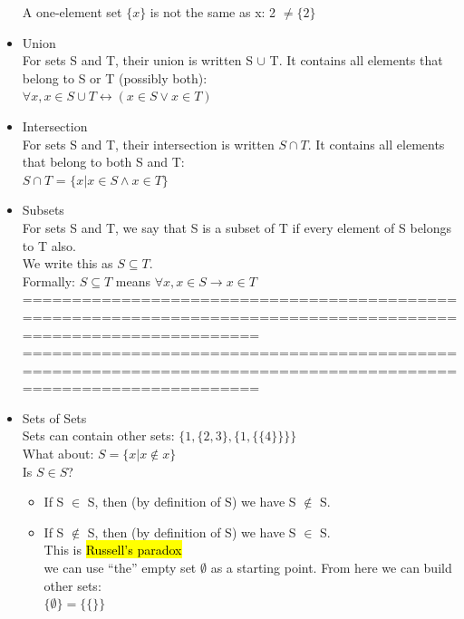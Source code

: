 \documentclass{article}
\begin{document}
\begin{itemize}
A one-element set $\{x\}$ is not the same as x: 2 $\neq \{2\}$\\
\item Union\\
For sets S and T, their union is written S $\cup$ T.
It contains all elements that belong to S or T (possibly both):\\
$\forall x, x \in S \cup T \leftrightarrow (x \in S \lor x \in T)$\\
\item Intersection\\
For sets S and T, their intersection is written $S  \cap  T$.
It contains all elements that belong to both S and T:\\
$S \cap T$ = $\{ x | x \in S \land x \in T  \}$\\
\item Subsets\\
For sets S and T, we say that S is a subset of T if
every element of S belongs to T also.\\
We write this as $S \subseteq T$.\\Formally:
$S \subseteq T$ means  $\forall x , x \in S \rightarrow x \in T$\\
================================================================================================================
\newpage
================================================================================================================
\item Sets of Sets\\
Sets can contain other sets: $\{1, \{2, 3\}, \{1, \{\{4\}\}\}\}$\\
What about:
$S = \{ x | x \notin x \}$\\
Is $S \in S$?\\
\begin{itemize}
\item If S $\in$ S, then (by definition of S) we have S $\notin$ S.
\item If S $\notin$ S, then (by definition of S) we have S $\in$ S.\\
This is \hl{Russell’s paradox}\\

we can use “the” empty set $\emptyset$ as a starting point.
From here we can build other sets:\\
$\{ \emptyset \} = \{\{\}\}$


\end{itemize}
\end{itemize}
\end{document}
